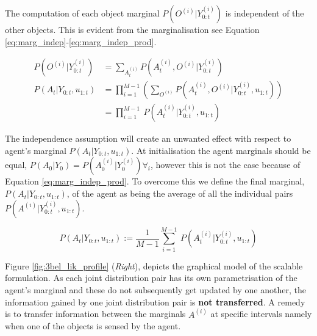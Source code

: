 The computation of each object marginal $P(O^{(i)}|Y^{(i)}_{0:t})$ is independent of the other objects. This is evident from the marginalisation 
see Equation \ref{eq:marg_indep}-\ref{eq:marg_indep_prod}.

\begin{align}
 P(O^{(i)}|Y^{(i)}_{0:t}) &= \sum\limits_{A^{(i)}_t} P(A^{(i)}_t,O^{(i)}|Y^{(i)}_{0:t}) \label{eq:marg_indep} \\
 P(A_t|Y_{0:t},u_{1:t})           &= \prod\limits_{i=1}^{M-1} \left(\sum\limits_{O^{(i)}} P(A^{(i)}_t,O^{(i)}|Y^{(i)}_{0:t},u_{1:t})\right)  \\
	                  &= \prod\limits_{i=1}^{M-1} \ P(A^{(i)}_t|Y^{(i)}_{0:t},u_{1:t}) \label{eq:marg_indep_prod}
\end{align}

The independence assumption will create an unwanted effect with respect to agent's marginal $P(A_t|Y_{0:t},u_{1:t})$. 
At initialisation the agent marginals should be equal, $P(A_0|Y_0) = P(A^{(i)}_0|Y^{(i)}_0) \forall_i$, however this is not the case because of 
Equation \ref{eq:marg_indep_prod}. To overcome this we define the final marginal, $P(A_t|Y_{0:t},u_{1:t})$, of the agent as being the average of all the individual
pairs $P(A^{(i)}|Y^{(i)}_{0:t},u_{1:t})$.

\begin{equation}
  P(A_t|Y_{0:t},u_{1:t}) := \frac{1}{M-1} \sum\limits_{i=1}^{M-1} \ P(A^{(i)}_t|Y^{(i)}_{0:t},u_{1:t}) \label{eq:marg_indep_sum}
\end{equation}

Figure \ref{fig:3bel_lik_profile} (\textit{Right}), depicts the graphical model of the scalable formulation. 
As each joint distribution pair has its own parametrisation of the agent's marginal and these do not subsequently get updated by one another,
the information gained by one joint distribution pair is \textbf{not transferred}.
A remedy is to transfer information between the marginals $A^{(i)}$ at specific intervals namely when one of the objects is sensed by the agent. 


